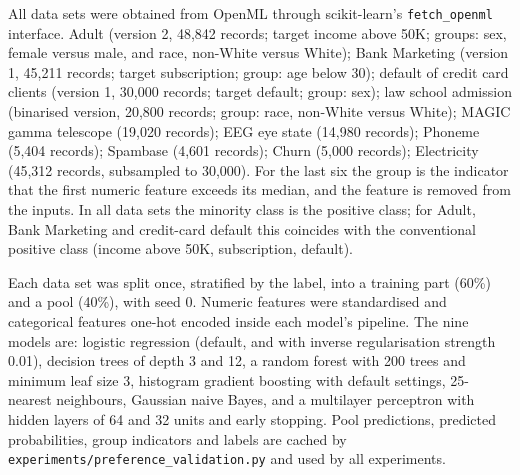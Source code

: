 \documentclass[pdflatex,sn-mathphys-num,iicol]{sn-jnl}
\theoremstyle{thmstyleone}
\theoremstyle{thmstyletwo}
\theoremstyle{thmstylethree}
\begin{document}
All data sets were obtained from OpenML through scikit-learn's \texttt{fetch\_openml} interface. Adult (version 2, 48,842 records; target income above 50K; groups: sex, female versus male, and race, non-White versus White); Bank Marketing (version 1, 45,211 records; target subscription; group: age below 30); default of credit card clients (version 1, 30,000 records; target default; group: sex); law school admission (binarised version, 20,800 records; group: race, non-White versus White); MAGIC gamma telescope (19,020 records); EEG eye state (14,980 records); Phoneme (5,404 records); Spambase (4,601 records); Churn (5,000 records); Electricity (45,312 records, subsampled to 30,000). For the last six the group is the indicator that the first numeric feature exceeds its median, and the feature is removed from the inputs. In all data sets the minority class is the positive class; for Adult, Bank Marketing and credit-card default this coincides with the conventional positive class (income above 50K, subscription, default).

Each data set was split once, stratified by the label, into a training part (60\%) and a pool (40\%), with seed 0. Numeric features were standardised and categorical features one-hot encoded inside each model's pipeline. The nine models are: logistic regression (default, and with inverse regularisation strength 0.01), decision trees of depth 3 and 12, a random forest with 200 trees and minimum leaf size 3, histogram gradient boosting with default settings, 25-nearest neighbours, Gaussian naive Bayes, and a multilayer perceptron with hidden layers of 64 and 32 units and early stopping. Pool predictions, predicted probabilities, group indicators and labels are cached by \texttt{experiments/preference\_validation.py} and used by all experiments.


\end{document}
